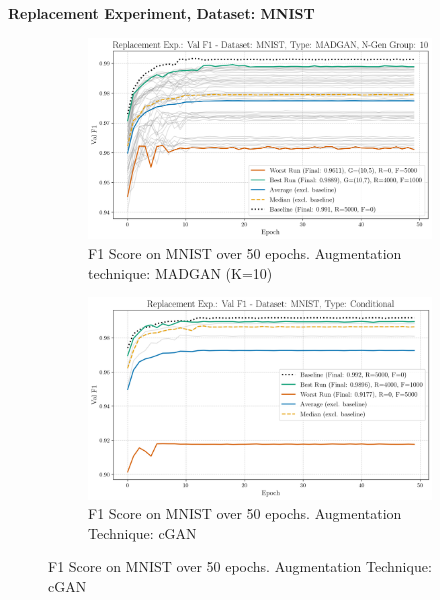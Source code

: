 \newpage

\noindent\textbf{Replacement Experiment, Dataset: MNIST}
\begin{figure}[H]
	\centering
	\begin{subfigure}{.85\textwidth}
		\includegraphics[width=\textwidth]{abb/strat_classifier_performance/MNIST_STRATIFIED_CLASSIFIERS_MADGAN_NEW/replacement_experiments/val_f1_score_MADGAN_MNIST_n_gen_10_all.png}
		\caption{F1 Score on MNIST over 50 epochs. Augmentation technique: MADGAN (K=10)}
        \label{fig:res_replacement_mnist_ccgan_vs_madgan__madgan}
	\end{subfigure}
	\begin{subfigure}{.85\textwidth}
		\includegraphics[width=\textwidth]{abb/strat_classifier_performance/MNIST_STRATIFIED_CLASSIFIERS_COND_GAN/replacement_experiments/val_f1_score_['COND']_MNIST_all.png}
		\caption{F1 Score on MNIST over 50 epochs. Augmentation Technique: cGAN}
        \label{fig:res_replacement_mnist_ccgan_vs_madgan__cgan}
	\end{subfigure}
\end{figure}

